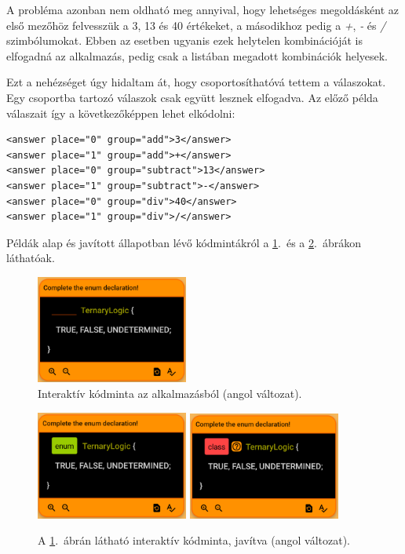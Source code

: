 \documentclass[12pt,a4paper]{article}
\begin{document}
	A probléma azonban nem oldható meg annyival, hogy lehetséges megoldásként az első mezőhöz felvesszük a 3, 13 és 40 értékeket, a másodikhoz pedig a \textit{+}, \textit{-} és \textit{/} szimbólumokat. Ebben az esetben ugyanis ezek helytelen kombinációját is elfogadná az alkalmazás, pedig csak a listában megadott kombinációk helyesek.
	
	Ezt a nehézséget úgy hidaltam át, hogy csoportosíthatóvá tettem a válaszokat. Egy csoportba tartozó válaszok csak együtt lesznek elfogadva. Az előző példa válaszait így a következőképpen lehet elkódolni:
	
	\bigskip
	\begin{lstlisting}
<answer place="0" group="add">3</answer>
<answer place="1" group="add">+</answer>
<answer place="0" group="subtract">13</answer>
<answer place="1" group="subtract">-</answer>
<answer place="0" group="div">40</answer>
<answer place="1" group="div">/</answer>
	\end{lstlisting}
	\bigskip
	
	Példák alap és javított állapotban lévő kódmintákról a \ref{interactive_component_figure}.\ és a \ref{interactive_component_completed_figure}.\ ábrákon láthatóak. 
	
	\begin{figure}
		\centering
		\includegraphics[width=5cm]{interactive_not_completed}
		\caption{Interaktív kódminta az alkalmazásból (angol változat).}
		\label{interactive_component_figure}
	\end{figure}
	
	\begin{figure}
		\centering
		\includegraphics[width=5cm]{interactive_correct}
		\includegraphics[width=5cm]{interactive_incorrect}
		\caption{A \ref{interactive_component_figure}.\ ábrán látható interaktív kódminta, javítva (angol változat).}
		\label{interactive_component_completed_figure}
	\end{figure}
	
\end{document}
